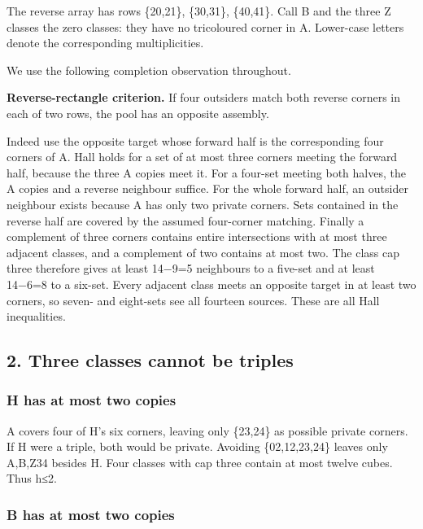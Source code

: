 \documentclass[
  10pt,
]{article}
\begin{document}
The reverse array has rows \{20,21\}, \{30,31\}, \{40,41\}. Call B and
the three Z classes the zero classes: they have no tricoloured corner in
A. Lower-case letters denote the corresponding multiplicities.

We use the following completion observation throughout.

\textbf{Reverse-rectangle criterion.} If four outsiders match both
reverse corners in each of two rows, the pool has an opposite assembly.

Indeed use the opposite target whose forward half is the corresponding
four corners of A. Hall holds for a set of at most three corners meeting
the forward half, because the three A copies meet it. For a four-set
meeting both halves, the A copies and a reverse neighbour suffice. For
the whole forward half, an outsider neighbour exists because A has only
two private corners. Sets contained in the reverse half are covered by
the assumed four-corner matching. Finally a complement of three corners
contains entire intersections with at most three adjacent classes, and a
complement of two contains at most two. The class cap three therefore
gives at least 14−9=5 neighbours to a five-set and at least 14−6=8 to a
six-set. Every adjacent class meets an opposite target in at least two
corners, so seven- and eight-sets see all fourteen sources. These are
all Hall inequalities.

\hypertarget{three-classes-cannot-be-triples}{%
\subsection*{2. Three classes cannot be
triples}\label{three-classes-cannot-be-triples}}

\hypertarget{h-has-at-most-two-copies}{%
\subsubsection*{H has at most two
copies}\label{h-has-at-most-two-copies}}

A covers four of H's six corners, leaving only \{23,24\} as possible
private corners. If H were a triple, both would be private. Avoiding
\{02,12,23,24\} leaves only A,B,Z34 besides H. Four classes with cap
three contain at most twelve cubes. Thus h≤2.

\hypertarget{b-has-at-most-two-copies}{%
\subsubsection*{B has at most two
copies}\label{b-has-at-most-two-copies}}
\end{document}
